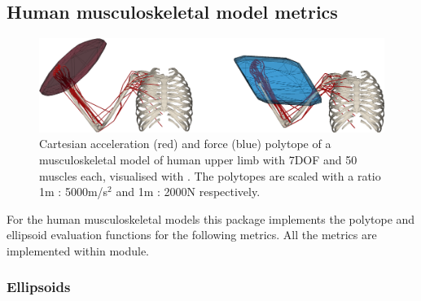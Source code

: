 
\subsection{Human musculoskeletal model metrics}
\label{sec:pycapacity_human}

\begin{figure}[!h]
    \centering
    \includegraphics[width=\linewidth]{Papers/images/force_acceleration.png}
    \caption{Cartesian acceleration (red) and force (blue) polytope of a musculoskeletal model of human upper limb with 7DOF and 50 muscles each, visualised with . The polytopes are scaled with a ratio 1m : 5000m/s$^2$ and 1m : 2000N respectively.}
    \label{fig:force_polytope_human_revisit}
\end{figure}

For the human musculoskeletal models this package implements the polytope and ellipsoid evaluation functions for the following metrics. All the metrics are implemented within  module.

\subsubsection*{Ellipsoids}

